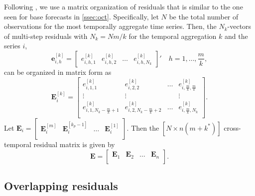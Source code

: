 \documentclass[a4paper,11pt]{article}
\newcommand{\evet}{\bm{e}}
\newcommand{\Evet}{\bm{E}}
\theoremstyle{definition}
\begin{document}
Following \cite{difonzo2023}, we use a matrix organization of residuals that is similar to the one seen for base forecasts in \autoref{ssec:oct}. Specifically, let $N$ be the total number of observations for the most temporally aggregate time series. Then, the $N_k$-vectors of multi-step residuals with $N_k = Nm/k$ for the temporal aggregation $k$ and the series $i$,
$$
	\evet_{i,h}^{[k]} = \begin{bmatrix}
		e_{i,h,1}^{[k]} & e_{i,h,2}^{[k]} & \dots & e_{i,h,N_k}^{[k]}
	\end{bmatrix}' \quad h = 1,\dots, \frac{m}{k},
$$
can be organized in matrix form as
\begin{equation}\label{eq:Evetki}
	\Evet_i^{[k]} = \begin{bmatrix}
		e_{i,1,1}^{[k]}                     & e_{i,2,2}^{[k]}                     & \dots & e_{i,\frac{m}{k},\frac{m}{k}}^{[k]} \\
		\vdots                            & \vdots                            &       & \vdots                  \\
		e_{i,1,N_k - \frac{m}{k} + 1}^{[k]} & e_{i,2,N_k - \frac{m}{k} + 2}^{[k]} & \dots & e_{i,\frac{m}{k},N_k}^{[k]}         \\
	\end{bmatrix}.
\end{equation}
Let $\Evet_i = \begin{bmatrix}
		\Evet_i^{[m]} & \Evet_i^{[k_p-1]} & \dots & \Evet_i^{[1]} \\
	\end{bmatrix}$. Then the $[N \times n(m+k^\ast)]$ cross-temporal residual matrix is given by
\begin{equation}
	\label{eq:Emat}
	\Evet = \begin{bmatrix}
		\Evet_1 & \Evet_2 & \dots & \Evet_n \\
	\end{bmatrix}.
\end{equation}



\subsection{Overlapping residuals}\label{ssec:over_res}
\end{document}
